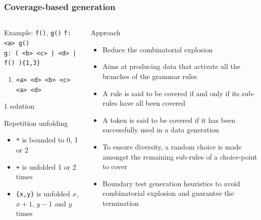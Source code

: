 \documentclass[9pt]{beamer}
\newcommand{\code}[1]{\texttt{#1}}
\begin{document}
\begin{frame}[t]
\frametitle{Coverage-based generation}

\begin{columns}[t]

\begin{column}{.4\textwidth}
\begin{exampleblock}{Example: \code{f()}, \code{g()}}
\small
\code{f: <a> g()} \\
\code{g: ( <b> <c> | <d> | f() )\{1,3\}} \\

\begin{enumerate}
\onslide<+->
\item \code{<a> <d> <b> <c> <a> <d>}
\end{enumerate}
1 solution
\end{exampleblock}

\begin{block}{Repetition unfolding}
\begin{itemize}
\item \code{*} is bounded to 0, 1 or 2
\item \code{+} is unfolded 1 or 2 times
\item \code{\{x,y\}} is unfolded $x$, $x + 1$, $y - 1$ and $y$ times
\end{itemize}
\end{block}
\end{column}

\begin{column}{.6\textwidth}
\begin{block}{Approach}
\begin{itemize}
\item Reduce the combinatorial explosion
\item Aims at producing data that activate all the branches of the grammar rules
\item A rule is said to be covered if and only if its sub-rules have all been
covered
\item A token is said to be covered if it has been successfully used in a data
generation
\item To ensure diversity, a random choice is made amongst the remaining
sub-rules of a choice-point to cover
\item Boundary test generation heuristics to avoid combinatorial explosion and
guarantee the termination
\end{itemize}
\end{block}
\end{column}

\end{columns}

\end{frame}
\end{document}
